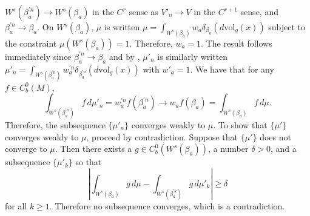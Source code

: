 \documentclass[10pt,a4paper]{amsart}
\renewenvironment{proof}{\par\noindent{\bf Proof\ }}{\hfill\BlackBox\\[2mm]}
\begin{document}
\begin{proof}
    $W^s(\beta_a^{'n}) \rightarrow W^s(\beta_a)$ in the $C^r$ sense as $V'_n \rightarrow V$ in the $C^{r+1}$ sense, and $\beta_a^{'n} \rightarrow \beta_a$. On $W^s(\beta_a)$, $\mu$ is written $\mu = \int_{W^s(\beta_a)} w_a \delta_{\beta_{a}} \left(d\text{vol}_g(x)\right)$ subject to the constraint $\mu(W^s(\beta_a))=1$. Therefore, $w_a=1$. The result follows immediately since $\beta_a^{'n} \rightarrow \beta_a$ and by , $\mu'_n$ is similarly written $\mu'_n = \int_{W^s(\beta^{'n}_a)} w^{'n}_a \delta_{\beta^{'n}_{a}} \left(d\text{vol}_g(x)\right)$ with $w'_a=1$. We have that for any $f \in C^0_b(M)$,
    \begin{equation*}
        \int_{W^s(\beta_a^{'n})} f \,d\mu'_{n} = w_a^{'n} f(\beta_a^{'n}) \rightarrow w_a f(\beta_a) = \int_{W^s(\beta_a)} f \,d\mu.
    \end{equation*}
    Therefore, the subsequence $\{\mu'_{n}\}$ converges weakly to $\mu$. To show that $\{\mu'\}$ converges weakly to $\mu$, proceed by contradiction. Suppose that $\{\mu'\}$ does not converge to $\mu$. Then there exists a $g\in C^0_b(W^s(\beta_a))$, a number $\delta > 0$, and a subsequence $\{\mu'_{k}\}$ so that 
    \begin{equation*}
        \left|\int_{W^s(\beta_a)} g \,d\mu - \int_{W^s(\beta_a^{'k})} g \,d\mu'_{k} \right| \geq \delta
    \end{equation*}
    for all $k \geq 1$. Therefore no subsequence converges, which is a contradiction.
\end{proof}
\end{document}
